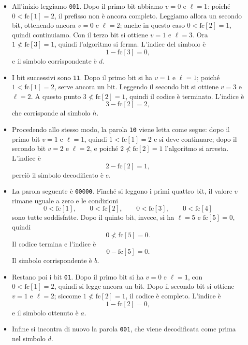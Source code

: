 \documentclass{article}
\theoremstyle{definition}
\numberwithin{equation}{section}
\begin{document}
\begin{itemize}
    \item All'inizio leggiamo \texttt{001}. Dopo il primo bit abbiamo $v=0$ e $\ell=1$:
          poiché $0<\text{fc}[1]=2$, il prefisso non è ancora completo. Leggiamo allora
          un secondo bit, ottenendo ancora $v=0$ e $\ell=2$; anche in questo caso
          $0<\text{fc}[2]=1$, quindi continuiamo. Con il terzo bit si ottiene
          $v=1$ e $\ell=3$. Ora $1\not<\text{fc}[3]=1$, quindi l'algoritmo si ferma.
          L'indice del simbolo è
          \[
              1-\text{fc}[3]=0,
          \]
          e il simbolo corrispondente è $d$.

    \item I bit successivi sono \texttt{11}. Dopo il primo bit si ha $v=1$ e $\ell=1$;
          poiché $1<\text{fc}[1]=2$, serve ancora un bit. Leggendo il secondo bit si ottiene
          $v=3$ e $\ell=2$. A questo punto $3\not<\text{fc}[2]=1$, quindi il codice è
          terminato. L'indice è
          \[
              3-\text{fc}[2]=2,
          \]
          che corrisponde al simbolo $h$.

    \item Procedendo allo stesso modo, la parola \texttt{10} viene letta come segue:
          dopo il primo bit $v=1$ e $\ell=1$, quindi $1<\text{fc}[1]=2$ e si deve
          continuare; dopo il secondo bit $v=2$ e $\ell=2$, e poiché
          $2\not<\text{fc}[2]=1$ l'algoritmo si arresta. L'indice è
          \[
              2-\text{fc}[2]=1,
          \]
          perciò il simbolo decodificato è $e$.

    \item La parola seguente è \texttt{00000}. Finché si leggono i primi quattro bit,
          il valore $v$ rimane uguale a zero e le condizioni
          \[
              0<\text{fc}[1],\qquad
              0<\text{fc}[2],\qquad
              0<\text{fc}[3],\qquad
              0<\text{fc}[4]
          \]
          sono tutte soddisfatte. Dopo il quinto bit, invece, si ha $\ell=5$ e
          $\text{fc}[5]=0$, quindi
          \[
              0\not<\text{fc}[5]=0.
          \]
          Il codice termina e l'indice è
          \[
              0-\text{fc}[5]=0.
          \]
          Il simbolo corrispondente è $b$.

    \item Restano poi i bit \texttt{01}. Dopo il primo bit si ha $v=0$ e $\ell=1$,
          con $0<\text{fc}[1]=2$, quindi si legge ancora un bit. Dopo il secondo bit
          si ottiene $v=1$ e $\ell=2$; siccome $1\not<\text{fc}[2]=1$, il codice è
          completo. L'indice è
          \[
              1-\text{fc}[2]=0,
          \]
          e il simbolo ottenuto è $a$.

    \item Infine si incontra di nuovo la parola \texttt{001}, che viene decodificata
          come prima nel simbolo $d$.
\end{itemize}
\end{document}

